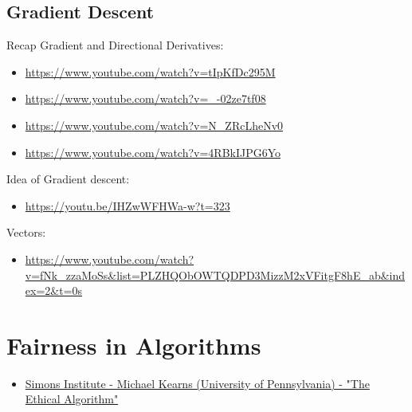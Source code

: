 \section{Gradient Descent}
\begin{resource}
Recap Gradient and Directional Derivatives:
\begin{itemize}
\item \url{https://www.youtube.com/watch?v=tIpKfDc295M}

\item \url{https://www.youtube.com/watch?v=_-02ze7tf08}

\item \url{https://www.youtube.com/watch?v=N_ZRcLheNv0}

\item \url{https://www.youtube.com/watch?v=4RBkIJPG6Yo}
\end{itemize}






Idea of Gradient descent:\\
\begin{itemize}
\item \url{https://youtu.be/IHZwWFHWa-w?t=323}
\end{itemize}
Vectors:\\
\begin{itemize}
\item \url{https://www.youtube.com/watch?v=fNk_zzaMoSs&list=PLZHQObOWTQDPD3MizzM2xVFitgF8hE_ab&index=2&t=0s}
\end{itemize}
\end{resource}


\chapter{Fairness in Algorithms}
\begin{resource}
\begin{itemize}
\item \href{https://www.youtube.com/watch?v=jtZdytJA0m8&ab_channel=SimonsInstitute}{Simons Institute - Michael Kearns (University of Pennsylvania) - "The Ethical Algorithm"}
\end{itemize}
\end{resource}



%
%
